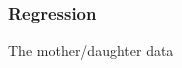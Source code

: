 \documentclass[handout]{beamer}
\begin{document}


   \begin{frame}
   \frametitle{Regression}
   \begin{center}
   \end{center}
   The mother/daughter data
   \end{frame}
\end{document}
